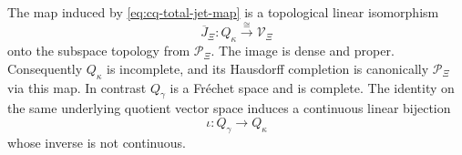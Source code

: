 \begin{cqtheorem}
\label{thm:cq-jet-topology}
The map induced by \eqref{eq:cq-total-jet-map} is a topological
linear isomorphism
\[
 \overline J_\Xi:Q_\kappa\xrightarrow{\ \cong\ }
 \mathcal V_\Xi
\]
onto the subspace topology from $\mathcal P_\Xi$.
The image is dense and proper. Consequently $Q_\kappa$ is
incomplete, and its Hausdorff completion is canonically
$\mathcal P_\Xi$ via this map. In contrast $Q_\gamma$ is a
Fr\'echet space and is complete. The identity on the same
underlying quotient vector space induces a continuous linear
bijection
\begin{equation}\label{eq:cq-topology-comparison-strict}
 \iota:Q_\gamma\longrightarrow Q_\kappa
\end{equation}
whose inverse is not continuous.
\end{cqtheorem}

